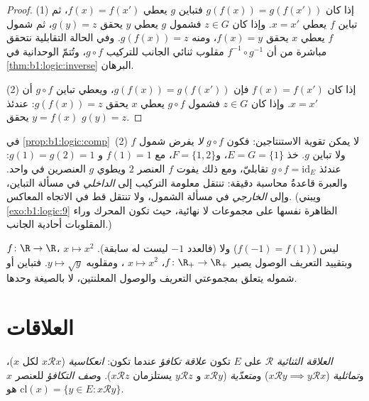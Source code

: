 \begin{proof}
(1) إذا كان $g(f(x)) = g(f(x'))$ فتباين $g$ يعطي $f(x) = f(x')$،
ثم تباين $f$ يعطي $x = x'$. وإذا كان $z \in G$ فشمول $g$ يعطي $y$
يحقق $g(y) = z$، ثم شمول $f$ يعطي $x$ يحقق $f(x) = y$، ومنه
$g(f(x)) = z$. وفي الحالة التقابلية نتحقق مباشرة من أن
$f^{-1} \circ g^{-1}$ مقلوب ثنائي الجانب للتركيب $g \circ f$، وتُتمّ
الوحدانية في \cref{thm:b1:logic:inverse} البرهان.

(2) إذا كان $f(x) = f(x')$ فإن $g(f(x)) = g(f(x'))$، ويعطي تباين
$g \circ f$ أن $x = x'$. وإذا كان $z \in G$ فشمول $g \circ f$
يعطي $x$ يحقق $g(f(x)) = z$: عندئذ $y = f(x)$ يحقق $g(y) = z$.
\end{proof}

\begin{example}\label{ex:b1:logic:compsharp}
في \cref{prop:b1:logic:comp}~(2) لا يمكن تقوية
الاستنتاجين: فكون $g \circ f$  \emph{لا} يفرض شمول $f$
ولا تباين $g$. خذ $E = G = \{1\}$، و$F = \{1,
2\}$، مع $f(1) = 1$ و $g(1) = g(2) = 1$: عندئذ $g \circ f =
\mathrm{id}_E$ تقابليّ، ومع ذلك يفوت $f$ العنصر $2$
ويطوي $g$ العنصرين في واحد. والعبرة قاعدةُ محاسبة دقيقة:
تنتقل معلومة التركيب إلى  \emph{الداخلي} في مسألة
التباين، وإلى  \emph{الخارجي} في مسألة الشمول، ولا
تنتقل قط في الاتجاه المعاكس. (ويبني \cref{exo:b1:logic:9} الظاهرة
نفسها على مجموعات لا نهائية، حيث تكون المحرك وراء المقلوبات
أحادية الجانب.)
\end{example}

\begin{example}\label{ex:b1:logic:injexamples}
 $f \colon \R \to \R$، $x \mapsto x^2$ ليس  ($f(-1) =
f(1)$) ولا  (فالعدد $-1$ ليست له سابقة). وبتقييد  التعريف
 الوصول يصير $f \colon \R_+ \to \R_+$، $x \mapsto x^2$ ،
ومقلوبه $y \mapsto \sqrt y$. فتباين  أو شموله يتعلق بمجموعتي
التعريف والوصول المعلنتين، لا بالصيغة وحدها.
\end{example}

\section{العلاقات}

\begin{definition}\label{def:b1:logic:equiv}
\emph{العلاقة الثنائية} $\mathcal{R}$ على  $E$ تكون
\emph{علاقة تكافؤ} عندما تكون:
\emph{انعكاسية} ($x \mathbin{\mathcal{R}} x$ لكل $x$)،
و\emph{تماثلية} ($x \mathbin{\mathcal{R}} y \implies y
\mathbin{\mathcal{R}} x$) و\emph{متعدّية} ($x
\mathbin{\mathcal{R}} y$ و $y \mathbin{\mathcal{R}} z$ يستلزمان $x
\mathbin{\mathcal{R}} z$). و\emph{صف التكافؤ} للعنصر $x$ هو
$\mathrm{cl}(x) = \{y \in E : x \mathbin{\mathcal{R}} y\}$.
\end{definition}

